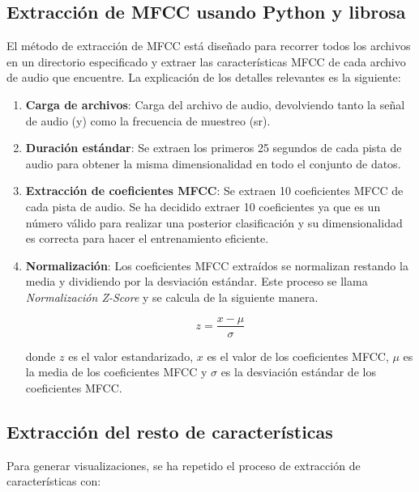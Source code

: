 \subsection{Extracción de MFCC usando Python y librosa}

El método de extracción de MFCC está diseñado para recorrer todos los archivos en un directorio especificado y extraer las características MFCC de cada archivo de audio que encuentre. La explicación de los detalles relevantes es la siguiente:

\begin{enumerate}
\tightlist
\item \textbf{Carga de archivos}: Carga del archivo de audio, devolviendo tanto la señal de audio (y) como la frecuencia de muestreo (sr).

\item \textbf{Duración estándar}: Se extraen los primeros 25 segundos de cada pista de audio para obtener la misma dimensionalidad en todo el conjunto de datos.

\item\textbf{Extracción de coeficientes MFCC}: Se extraen 10 coeficientes MFCC de cada pista de audio. Se ha decidido extraer 10 coeficientes ya que es un número válido para realizar una posterior clasificación y su dimensionalidad es correcta para hacer el entrenamiento eficiente.

\item \textbf{Normalización}: Los coeficientes MFCC extraídos se normalizan restando la media y dividiendo por la desviación estándar. Este proceso se llama \textit{Normalización Z-Score} y se calcula de la siguiente manera.

\begin{equation}
z = \frac{x - \mu}{\sigma}
\end{equation}

donde \(z\) es el valor estandarizado, \(x\) es el valor de los coeficientes MFCC, \(\mu\) es la media de los coeficientes MFCC y \(\sigma\) es la desviación estándar de los coeficientes MFCC.

\end{enumerate}

\subsection{Extracción del resto de características}

Para generar visualizaciones, se ha repetido el proceso de extracción de características con:


